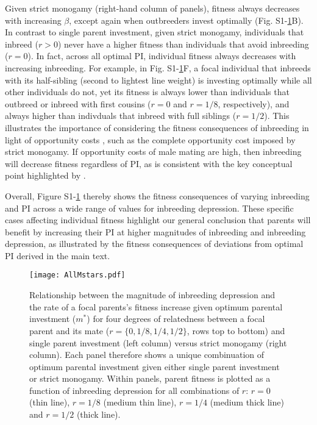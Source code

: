 \documentclass[12pt]{article}
\begin{document}
Given strict monogamy (right-hand column of panels), fitness always decreases with increasing $\beta$, except again when outbreeders invest optimally (Fig. S1-\ref{AllMstars}B). In contrast to single parent investment, given strict monogamy, individuals that inbreed ($r>0$) never have a higher fitness than individuals that avoid inbreeding ($r=0$). In fact, across all optimal PI, individual fitness always decreases with increasing inbreeding. For example, in Fig. S1-\ref{AllMstars}F, a focal individual that inbreeds with its half-sibling (second to lightest line weight) is investing optimally while all other individuals do not, yet its fitness is always lower than individuals that outbreed or inbreed with first cousins ($r=0$ and $r=1/8$, respectively), and always higher than indivduals that inbreed with full siblings ($r=1/2$). This illustrates the importance of considering the fitness consequences of inbreeding in light of opportunity costs \cite[][]{Waser1986}, such as the complete opportunity cost imposed by strict monogamy. If opportunity costs of male mating are high, then inbreeding will decrease fitness regardless of PI, as is consistent with the key conceptual point highlighted by \cite{Waser1986}.

Overall, Figure S1-\ref{AllMstars} thereby shows the fitness consequences of varying inbreeding and PI across a wide range of values for inbreeding depression. These specific cases affecting individual fitness highlight our general conclusion that parents will benefit by increasing their PI at higher magnitudes of inbreeding and inbreeding depression, as illustrated by the fitness consequences of deviations from optimal PI derived in the main text.

\clearpage

\begin{figure}[H]
\begin{center}				
\texttt{[image: AllMstars.pdf]}
\end{center}
\caption{Relationship between the magnitude of inbreeding depression and the rate of a focal parents's fitness increase given optimum parental investment ($m^{*}$) for four degrees of relatedness between a focal parent and its mate ($r=\{0, 1/8, 1/4, 1/2\}$, rows top to bottom) and single parent investment (left column) versus strict monogamy (right column). Each panel therefore shows a unique combinuation of optimum parental investment given either single parent investment or strict monogamy. Within panels, parent fitness is plotted as a function of inbreeding depression for all combinations of $r$: $r=0$ (thin line), $r=1/8$ (medium thin line), $r=1/4$ (medium thick line) and $r=1/2$ (thick line).}
\label{AllMstars}
\end{figure}

\clearpage



\end{document}
